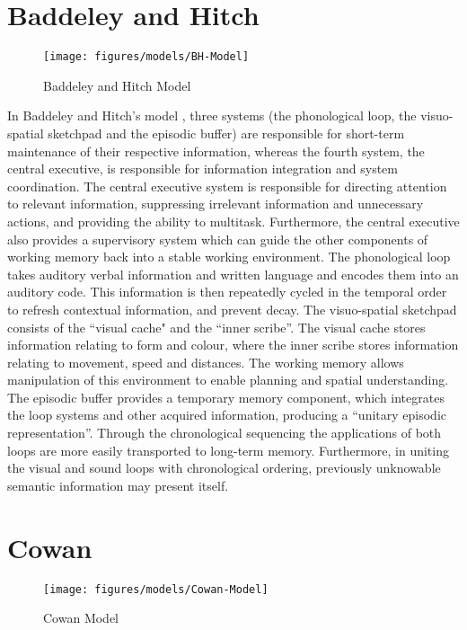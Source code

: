 \section{Baddeley and Hitch}
\begin{figure}[htp]
	\begin{center}
		\texttt{[image: figures/models/BH-Model]}
		\caption{Baddeley and Hitch Model}
	\end{center}
	\label{fig:BH_MODEL}
\end{figure}
In Baddeley and Hitch's model \cite{Work_Mem, Episodic_Buff}, three systems (the phonological loop, the visuo-spatial sketchpad and the episodic buffer) are responsible for short-term maintenance of their respective information, whereas the fourth system, the central executive, is responsible for information integration and system coordination.  The central executive system is responsible for directing attention to relevant information, suppressing irrelevant information and unnecessary actions, and providing the ability to multitask. Furthermore, the central executive also provides a supervisory system which can guide the other components of working memory back into a stable working environment. The phonological loop takes auditory verbal information and written language and encodes them into an auditory code. This information is then repeatedly cycled in the temporal order to refresh contextual information, and prevent decay. The visuo-spatial sketchpad consists of the ``visual cache" and the ``inner scribe''.  The visual cache stores information relating to form and colour, where the inner scribe stores information relating to movement, speed and distances. The working memory allows manipulation of this environment to enable planning and spatial understanding.  The episodic buffer provides a temporary memory component, which integrates the loop systems and other acquired information, producing a ``unitary episodic representation''\cite{Episodic_Buff}.  Through the chronological sequencing the applications of both loops are more easily transported to long-term memory.  Furthermore, in uniting the visual and sound loops with chronological ordering, previously unknowable semantic information may present itself.

\section{Cowan}
\begin{figure}[htp]
	\begin{center}
		\texttt{[image: figures/models/Cowan-Model]}
		\caption{Cowan Model}
	\end{center}
	\label{fig:COWAN_MODEL}
\end{figure}

